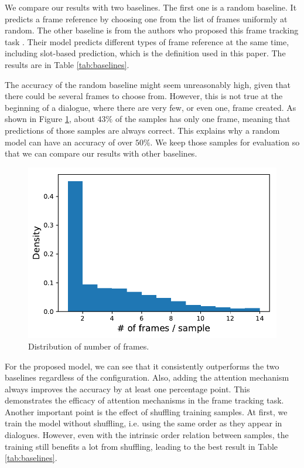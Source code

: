 We compare our results with two baselines. The first one is a random baseline. It predicts a frame reference by choosing one from the list of frames uniformly at random. The other baseline is from the authors who proposed this frame tracking task \cite{schulz2017frame}. Their model predicts different types of frame reference at the same time, including slot-based prediction, which is the definition used in this paper.
The results are in Table \ref{tab:baselines}.

The accuracy of the random baseline might seem unreasonably high, given that there could be several frames to choose from. However, this is not true at the beginning of a dialogue, where there are very few, or even one, frame created. As shown in Figure \ref{fig:frames-dist}, about $43\%$ of the samples has only one frame, meaning that predictions of those samples are always correct. This explains why a random model can have an accuracy of over $50\%$. We keep those samples for evaluation so that we can compare our results with other baselines.

\begin{figure}
    \centering
    \includegraphics{figures/n_frames_dist.pdf}
    \caption[Distribution of number of frames]{Distribution of number of frames.}
    \label{fig:frames-dist}
\end{figure}

For the proposed model, we can see that it consistently outperforms the two baselines regardless of the configuration.
Also, adding the attention mechanism always improves the accuracy by at least one percentage point. This demonstrates the efficacy of attention mechanisms in the frame tracking task.
Another important point is the effect of shuffling training samples. At first, we train the model without shuffling, i.e. using the same order as they appear in dialogues. However, even with the intrinsic order relation between samples, the training still benefits a lot from shuffling, leading to the best result in Table \ref{tab:baselines}.

